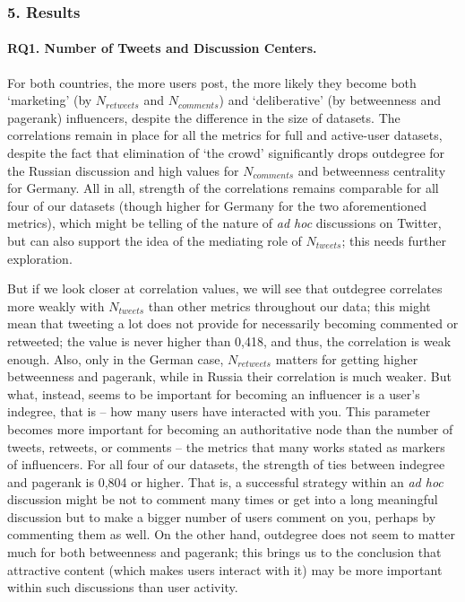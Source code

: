 \subsubsection{5. Results}

\paragraph{RQ1. Number of Tweets and Discussion Centers.} For both countries, the more users post, the more likely they become both ‘marketing’ (by \(N_{retweets}\) and \(N_{comments}\)) and ‘deliberative’ (by betweenness and pagerank) influencers, despite the difference in the size of datasets. The correlations remain in place for all the metrics for full and active-user datasets, despite the fact that elimination of ‘the crowd’ significantly drops outdegree for the Russian discussion and high values for \(N_{comments}\) and betweenness centrality for Germany. All in all, strength of the correlations remains comparable for all four of our datasets (though higher for Germany for the two aforementioned metrics), which might be telling of the nature of \textit{ad hoc} discussions on Twitter, but can also support the idea of the mediating role of \(N_{tweets}\); this needs further exploration.

But if we look closer at correlation values, we will see that outdegree correlates more weakly with \(N_{tweets}\) than other metrics throughout our data; this might mean that tweeting a lot does not provide for necessarily becoming commented or retweeted; the value is never higher than 0,418, and thus, the correlation is weak enough. Also, only in the German case, \(N_{retweets}\) matters for getting higher betweenness and pagerank, while in Russia their correlation is much weaker. But what, instead, seems to be important for becoming an influencer is a user’s indegree, that is -- how many users have interacted with you. This parameter becomes more important for becoming an authoritative node than the number of tweets, retweets, or comments -- the metrics that many works stated as markers of influencers. For all four of our datasets, the strength of ties between indegree and pagerank is 0,804 or higher. That is, a successful strategy within an \textit{ad hoc} discussion might be not to comment many times or get into a long meaningful discussion but to make a bigger number of users comment on you, perhaps by commenting them as well. On the other hand, outdegree does not seem to matter much for both betweenness and pagerank; this brings us to the conclusion that attractive content (which makes users interact with it) may be more important within such discussions than user activity.

